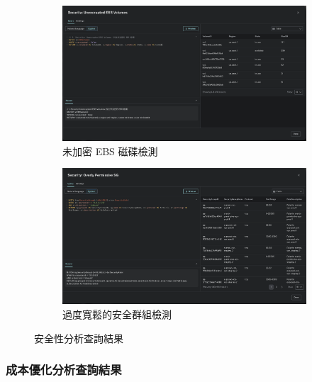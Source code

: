 \documentclass[11pt,a4paper]{ctexart}
\begin{document}
\begin{figure}[H]
\centering
\begin{subfigure}[b]{0.48\textwidth}
\centering
\includegraphics[width=\textwidth]{UnencryptedEBSVolumes.png}
\caption{未加密 EBS 磁碟檢測}
\label{fig:unencrypted_ebs}
\end{subfigure}
\hfill
\begin{subfigure}[b]{0.48\textwidth}
\centering
\includegraphics[width=\textwidth]{Overly Permissive SG.png}
\caption{過度寬鬆的安全群組檢測}
\label{fig:permissive_sg}
\end{subfigure}
\caption{安全性分析查詢結果}
\label{fig:security_analysis_results}
\end{figure}

\subsubsection{成本優化分析查詢結果}
\end{document}
